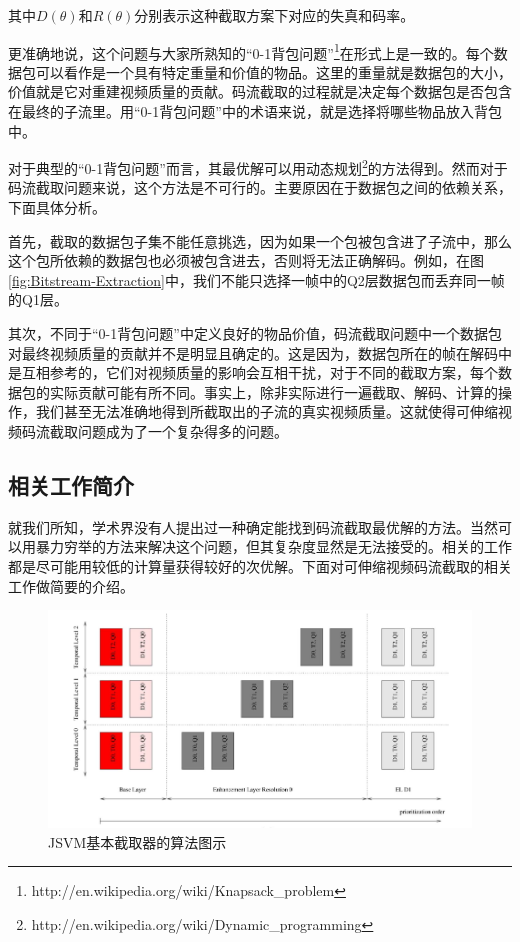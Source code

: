 其中$D(\theta)$和$R(\theta)$分别表示这种截取方案下对应的失真和码率。

更准确地说，这个问题与大家所熟知的“0-1背包问题”\footnote{http://en.wikipedia.org/wiki/Knapsack\_problem}在形式上是一致的。每个数据包可以看作是一个具有特定重量和价值的物品。这里的重量就是数据包的大小，价值就是它对重建视频质量的贡献。码流截取的过程就是决定每个数据包是否包含在最终的子流里。用“0-1背包问题”中的术语来说，就是选择将哪些物品放入背包中。

对于典型的“0-1背包问题”而言，其最优解可以用动态规划\footnote{http://en.wikipedia.org/wiki/Dynamic\_programming}的方法得到。然而对于码流截取问题来说，这个方法是不可行的。主要原因在于数据包之间的依赖关系，下面具体分析。

首先，截取的数据包子集不能任意挑选，因为如果一个包被包含进了子流中，那么这个包所依赖的数据包也必须被包含进去，否则将无法正确解码。例如，在图\ref{fig:Bitstream-Extraction}中，我们不能只选择一帧中的Q2层数据包而丢弃同一帧的Q1层。

其次，不同于“0-1背包问题”中定义良好的物品价值，码流截取问题中一个数据包对最终视频质量的贡献并不是明显且确定的。这是因为，数据包所在的帧在解码中是互相参考的，它们对视频质量的影响会互相干扰，对于不同的截取方案，每个数据包的实际贡献可能有所不同。事实上，除非实际进行一遍截取、解码、计算的操作，我们甚至无法准确地得到所截取出的子流的真实视频质量。这就使得可伸缩视频码流截取问题成为了一个复杂得多的问题。

\subsection{相关工作简介}

就我们所知，学术界没有人提出过一种确定能找到码流截取最优解的方法。当然可以用暴力穷举的方法来解决这个问题，但其复杂度显然是无法接受的。相关的工作都是尽可能用较低的计算量获得较好的次优解。下面对可伸缩视频码流截取的相关工作做简要的介绍。

\begin{figure}[h]
	\centering
	\includegraphics[width = 1.0\linewidth]{clip/06.png}
	\caption{JSVM基本截取器的算法图示\label{fig:06}}
\end{figure}

